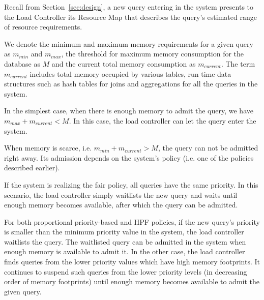 
Recall from Section~\ref{sec:design}, a new query entering in the system presents to the Load Controller its Resource Map that describes the query's estimated range of resource requirements.

We denote the minimum and maximum memory requirements for a given query as $m_{min}$ and $m_{max}$, the threshold for maximum memory consumption for the database as $M$ and the current total memory consumption as $m_{current}$. 
The term $m_{current}$ includes total memory occupied by various tables, run time data structures such as hash tables for joins and aggregations for all the queries in the system.

In the simplest case, when there is enough memory to admit the query, we have $m_{max} + m_{current} < M$. 
In this case, the load controller can let the query enter the system.

When memory is scarce, i.e. $m_{min}+m_{current}>M$, the query can not be admitted right away. 
Its admission depends on the system's policy (i.e. one of the policies described earlier).

If the system is realizing the fair policy, all queries have the same priority.
In this scenario, the load controller simply waitlists the new query and waits until enough memory becomes available, after which the query can be admitted.

For both proportional priority-based and HPF policies, if the new query's priority is smaller than the minimum priority value in the system, the load controller waitlists the query. 
The waitlisted query can be admitted in the system when enough memory is available to admit it.
In the other case, the load controller finds queries from the lower priority values which have high memory footprints. 
It continues to suspend such queries from the lower priority levels (in decreasing order of memory footprints) until enough memory becomes available to admit the given query. 

